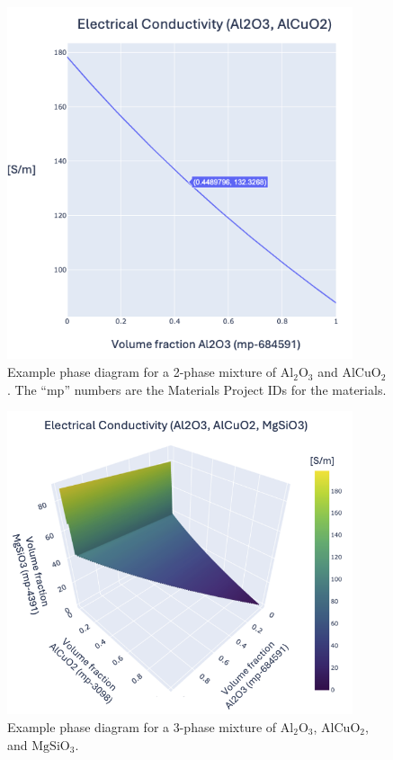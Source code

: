 \begin{figure}
\centering
\includegraphics[width=4in,height=\textheight,keepaspectratio]{figures/elec-cond-2phase-clean.png}
\caption{Example phase diagram for a 2-phase mixture of
\(\mathrm{Al_2O_3}\) and \(\mathrm{AlCuO_2}\). The ``mp'' numbers are
the Materials Project IDs for the materials. \label{fig:2phase}}
\end{figure}

\begin{figure}
\centering
\includegraphics[width=4in,height=\textheight,keepaspectratio]{figures/elec-cond-3phase-clean.png}
\caption{Example phase diagram for a 3-phase mixture of
\(\mathrm{Al_2O_3}\), \(\mathrm{AlCuO_2}\), and \(\mathrm{MgSiO_3}\).
\label{fig:3phase}}
\end{figure}


